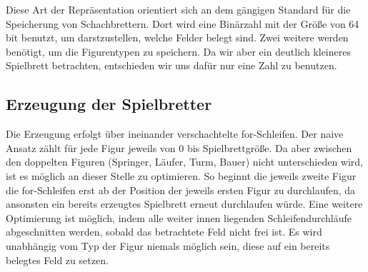 \documentclass[
	12pt,
	a4paper,
	BCOR10mm,
	DIV14,
	listof=totoc,
	bibliography=totoc,
	headsepline
]{scrreprt}
\begin{document}
Diese Art der Repräsentation orientiert sich an dem gängigen Standard für die Speicherung von Schachbrettern. Dort wird eine Binärzahl mit der Größe von  64 bit benutzt, um darstzustellen, welche Felder belegt sind.
Zwei weitere werden benötigt, um die Figurentypen zu speichern.
Da wir aber ein deutlich kleineres Spielbrett betrachten, entschieden wir uns dafür nur eine Zahl zu benutzen.



\subsection{Erzeugung der Spielbretter}

Die Erzeugung erfolgt über ineinander verschachtelte for-Schleifen.
Der naive Ansatz zählt für jede Figur jeweils von 0 bis Spielbrettgröße.
Da aber zwischen den doppelten Figuren (Springer, Läufer, Turm, Bauer) nicht unterschieden wird, ist es möglich an dieser Stelle zu optimieren.
So beginnt die jeweils zweite Figur die for-Schleifen erst ab der Position der jeweils ersten Figur zu durchlaufen, da ansonsten ein bereits erzeugtes Spielbrett erneut durchlaufen würde.
Eine weitere Optimierung ist möglich, indem alle weiter innen liegenden Schleifendurchläufe abgeschnitten werden, sobald das betrachtete Feld nicht frei ist. Es wird unabhängig vom Typ der Figur niemals möglich sein, diese auf ein bereits belegtes Feld zu setzen.
\end{document}
